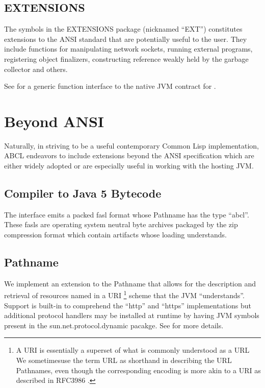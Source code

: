 \documentclass[10pt]{book}
\begin{document}


\section{EXTENSIONS}

The symbols in the EXTENSIONS package (nicknamed ``EXT'') constitutes
extensions to the \textsc{ANSI} standard that are potentially useful to the
user.  They include functions for manipulating network sockets,
running external programs, registering object finalizers, constructing
reference weakly held by the garbage collector and others.

See \cite{RHODES2007} for a generic function interface to the native
\textsc{JVM} contract for .



\chapter{Beyond ANSI}

Naturally, in striving to be a useful contemporary Common Lisp
implementation, ABCL endeavors to include extensions beyond the ANSI
specification which are either widely adopted or are especially useful
in working with the hosting \textsc{JVM}.

\section{Compiler to Java 5 Bytecode}

The  interface emits a packed fasl format whose
Pathname has the type  ``abcl''.  These fasls are operating system neutral
byte archives packaged by the zip compression format which contain
artifacts whose loading  understands.

\section{Pathname}

We implement an extension to the Pathname that allows for the
description and retrieval of resources named in a
\textsc{URI} \footnote{A \textsc{URI} is essentially a superset of
  what is commonly understood as a \textsc{URL} We sometimesuse the
  term URL as shorthand in describing the URL Pathnames, even though
  the corresponding encoding is more akin to a URI as described in
  RFC3986 \cite{rfc3986}.}  scheme that the \textsc{JVM}
``understands''.  Support is built-in to comprehend the ``http'' and
``https'' implementations but additional protocol handlers may be
installed at runtime by having \textsc{JVM} symbols present in the
sun.net.protocol.dynamic pacakge. See \cite{maso2000} for more
details.
\end{document}
